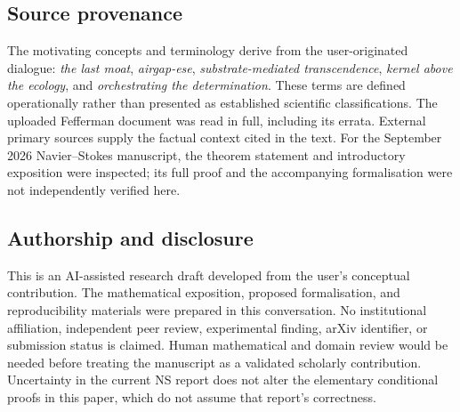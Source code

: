 \documentclass[11pt,a4paper]{article}
\theoremstyle{definition}
\theoremstyle{remark}
\begin{document}
\endgroup

\subsection*{Source provenance}
The motivating concepts and terminology derive from the user-originated dialogue: \emph{the last moat}, \emph{airgap-ese}, \emph{substrate-mediated transcendence}, \emph{kernel above the ecology}, and \emph{orchestrating the determination}. These terms are defined operationally rather than presented as established scientific classifications. The uploaded Fefferman document was read in full, including its errata. External primary sources supply the factual context cited in the text. For the September 2026 Navier--Stokes manuscript, the theorem statement and introductory exposition were inspected; its full proof and the accompanying formalisation were not independently verified here.

\subsection*{Authorship and disclosure}
This is an AI-assisted research draft developed from the user's conceptual contribution. The mathematical exposition, proposed formalisation, and reproducibility materials were prepared in this conversation. No institutional affiliation, independent peer review, experimental finding, arXiv identifier, or submission status is claimed. Human mathematical and domain review would be needed before treating the manuscript as a validated scholarly contribution. Uncertainty in the current NS report does not alter the elementary conditional proofs in this paper, which do not assume that report's correctness.


\end{document}
